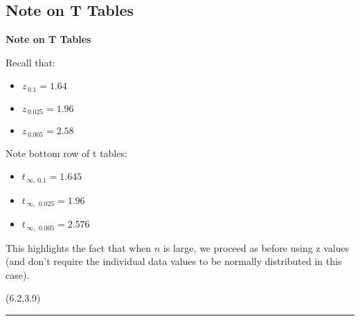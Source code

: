 \documentclass[compress]{beamer}        %
\makeatletter
\newcommand{\tcb}{\textcolor{beamer@blendedblue}}
\makeatother
\begin{document}
\subsection{Note on T Tables}
\begin{frame}{\bf \tcb{Note on T Tables}}\label{tapproachz}

\begin{minipage}{0.49\textwidth}
Recall that:\\[-0.2cm]
\begin{itemize}\itemsep0.4cm
\item $z_{\,0.1} = 1.64$
\item $z_{\,0.025} = 1.96$
\item $z_{\,0.005} = 2.58$\\[0.4cm]
\end{itemize}
\end{minipage}
\begin{minipage}{0.49\textwidth}
Note bottom row of t tables:\\[-0.2cm]
\begin{itemize}\itemsep0.4cm
\item $t_{\,\infty,\,0.1} = 1.645$
\item $t_{\,\infty,\,\,0.025} = 1.96$
\item $t_{\,\infty,\,\,0.005} = 2.576$\\[0.4cm]
\end{itemize}
\end{minipage}
\vspace{1cm}

This highlights the fact that when $n$ is large, we proceed as before using z values {\footnotesize(and don't require the individual data values to be normally distributed in this case)}. \\[0.4cm]

\begin{textblock}{1}(6.2,3.9)
\xymatrixcolsep{0.8cm}
\rule{1pt}{3.2cm}
\end{textblock}



\end{frame}
\end{document}
